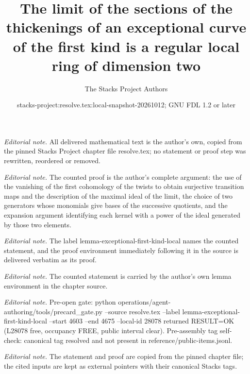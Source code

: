 \documentclass[10pt,a4paper]{amsart}
\title{The limit of the sections of the thickenings of an exceptional curve of the first kind is a regular local ring of dimension two}
\author{The Stacks Project Authors}
\date{stacks-project:resolve.tex:local-snapshot-20261012; GNU FDL 1.2 or later}
\theoremstyle{plain}
\theoremstyle{definition}
\theoremstyle{remark}
\numberwithin{equation}{subsection}
\begin{document}
\maketitle
\noindent\textit{Editorial note.} All delivered mathematical text is the author's own, copied from the pinned Stacks Project chapter file resolve.tex; no statement or proof step was rewritten, reordered or removed.\par\medskip
\noindent\textit{Editorial note.} The counted proof is the author's complete argument: the use of the vanishing of the first cohomology of the twists to obtain surjective transition maps and the description of the maximal ideal of the limit, the choice of two generators whose monomials give bases of the successive quotients, and the expansion argument identifying each kernel with a power of the ideal generated by those two elements.\par\medskip
\noindent\textit{Editorial note.} The label lemma-exceptional-first-kind-local names the counted statement, and the proof environment immediately following it in the source is delivered verbatim as its proof.\par\medskip
\noindent\textit{Editorial note.} The counted statement is carried by the author's own lemma environment in the chapter source.\par\medskip
\noindent\textit{Editorial note.} Pre-open gate: python operations/agent-authoring/tools/precard\_gate.py --source resolve.tex --label lemma-exceptional-first-kind-local --start 4603 --end 4675 --local-id 28078 returned RESULT=OK (L28078 free, occupancy FREE, public interval clear). Pre-assembly tag self-check: canonical tag resolved and not present in reference/public-items.jsonl.\par\medskip
\noindent\textit{Editorial note.} The statement and proof are copied from the pinned chapter file; the cited inputs are kept as external pointers with their canonical Stacks tags.\par\medskip
\end{document}
